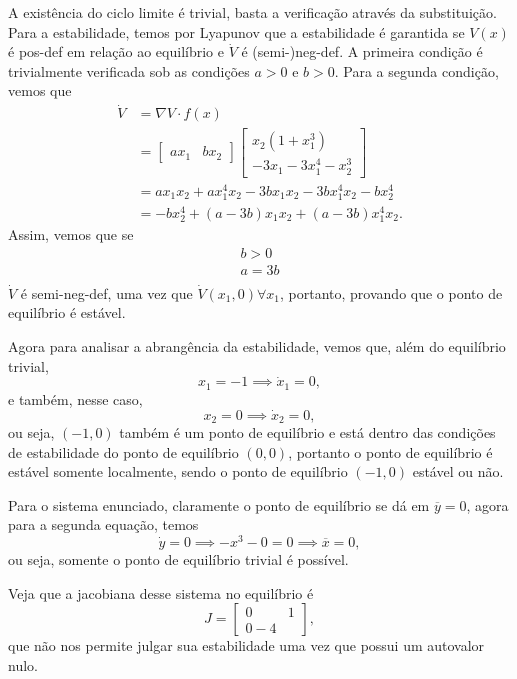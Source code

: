 \documentclass[a4paper]{report}
\begin{document}

A existência do ciclo limite é trivial, basta a verificação através da substituição. Para a estabilidade, temos por Lyapunov que a estabilidade é garantida se $V(x)$ é pos-def em relação ao equilíbrio e $\dot{V}$ é (semi-)neg-def. A primeira condição é trivialmente verificada sob as condições $a>0$ e $b>0$. Para a segunda condição, vemos que
\begin{align*}
    \dot{V} &= \nabla V \cdot f(x) \\
	    &= \begin{bmatrix} ax_1 & bx_2 \end{bmatrix} \begin{bmatrix} x_2\left( 1+x_1^3 \right) \\ -3x_1 -3x_1^{4} -x_2^3 \end{bmatrix} \\
	    &= ax_1x_2 + ax_1^{4}x_2 -3bx_1x_2 -3bx_1^{4}x_2 -bx_2^{4} \\
	    &= -bx_2^{4} +\left( a-3b \right) x_1x_2 +\left( a-3b \right) x_1^{4}x_2
.\end{align*}
Assim, vemos que se
\begin{align*}
    b>0 \\
    a=3b \\
\end{align*}
$\dot{V}$ é semi-neg-def, uma vez que $\dot{V}\left( x_1,0 \right) \forall x_1$, portanto, provando que o ponto de equilíbrio é estável.

Agora para analisar a abrangência da estabilidade, vemos que, além do equilíbrio trivial, \[
x_1 = -1 \implies \dot{x}_1 = 0
,\] e também, nesse caso, \[
x_2 = 0 \implies \dot{x}_2 = 0
,\] ou seja, $\left( -1,0 \right) $ também é um ponto de equilíbrio e está dentro das condições de estabilidade do ponto de equilíbrio $\left( 0,0 \right) $, portanto o ponto de equilíbrio é estável somente localmente, sendo o ponto de equilíbrio $\left( -1,0 \right) $ estável ou não.



Para o sistema enunciado, claramente o ponto de equilíbrio se dá em $\overline{y}=0$, agora para a segunda equação, temos \[
    \dot{y} = 0 \implies -x^3 -0 = 0 \implies \overline{x} = 0
,\] ou seja, somente o ponto de equilíbrio trivial é possível.

Veja que a jacobiana desse sistema no equilíbrio é \[
    J = \begin{bmatrix} 0 & 1 \\ 0 -4 \end{bmatrix} 
,\] que não nos permite julgar sua estabilidade uma vez que possui um autovalor nulo.
\end{document}
